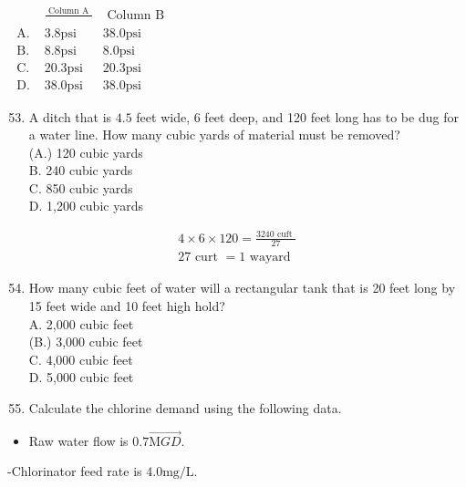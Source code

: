 \documentclass[10pt]{article}
\begin{document}
$\begin{array}{lrr} & \frac{\text { Column A }}{} & \text { Column B } \\ \text { A. } & 3.8 \mathrm{psi} & 38.0 \mathrm{psi} \\ \text { B. } & 8.8 \mathrm{psi} & 8.0 \mathrm{psi} \\ \text { C. } & 20.3 \mathrm{psi} & 20.3 \mathrm{psi} \\ \text { D. } & 38.0 \mathrm{psi} & 38.0 \mathrm{psi}\end{array}$

\begin{enumerate}
  \setcounter{enumi}{52}
  \item A ditch that is $4.5$ feet wide, 6 feet deep, and 120 feet long has to be dug for a water line. How many cubic yards of material must be removed?\\
(A.) 120 cubic yards\\
B. 240 cubic yards\\
C. 850 cubic yards\\
D. 1,200 cubic yards
\end{enumerate}

$$
\begin{array}{r}
4 \times 6 \times 120=\frac{3240 \text { cuft }}{27} \\
27 \text { curt }=1 \text { wayard }
\end{array}
$$

\begin{enumerate}
  \setcounter{enumi}{53}
  \item How many cubic feet of water will a rectangular tank that is 20 feet long by 15 feet wide and 10 feet high hold?\\
A. 2,000 cubic feet\\
(B.) 3,000 cubic feet\\
C. 4,000 cubic feet\\
D. 5,000 cubic feet

  \item Calculate the chlorine demand using the following data.

\end{enumerate}

\begin{itemize}
  \item Raw water flow is $0.7 \overrightarrow{\mathrm{M} G D}$.
\end{itemize}

-Chlorinator feed rate is $4.0 \mathrm{mg} / \mathrm{L}$.
\end{document}

